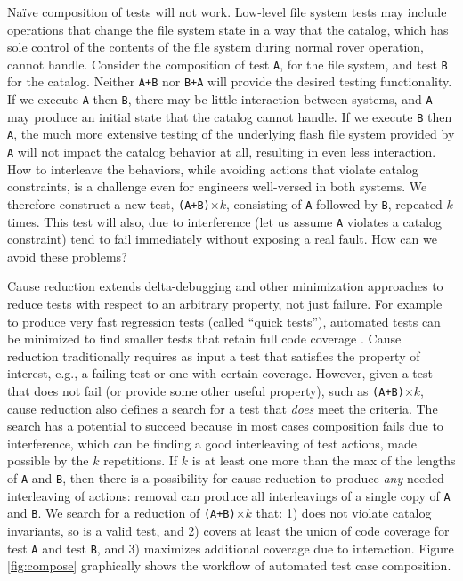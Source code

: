 \documentclass[12pt]{article}
\newcommand{\mycomment}[1]{}
\begin{document}
Na\"ive composition of tests will not work.  Low-level file system tests may
include operations that change the file system state in a way that the
catalog, which has sole control of the contents of the file system during normal rover operation, cannot handle.
Consider the composition of test {\tt A}, for the file system, and
test {\tt B} for the catalog.  Neither {\tt A+B} nor {\tt B+A} will provide the desired
testing functionality.  If we execute {\tt A} then {\tt B}, there may be little
interaction between systems, and {\tt A} may produce an initial state
that the catalog cannot handle.  If we execute {\tt B} then {\tt A},
the much more extensive testing of the underlying flash file system
provided by {\tt A} will not impact the catalog behavior at all, resulting
in even less interaction.  How to interleave the behaviors, while
avoiding actions that violate catalog constraints, is a challenge
even for engineers well-versed in both systems.  We therefore
construct a new test, {\tt (A+B)}$\times k$, consisting of {\tt A}
followed by {\tt B}, repeated $k$ times.  This test will also, due to
interference (let us assume {\tt A} violates a catalog constraint) tend to
fail immediately without exposing a real fault. How can we avoid these problems?

Cause reduction \cite{stvrcausereduce} extends
delta-debugging \cite{DD} and other minimization approaches to reduce tests with
respect to an arbitrary property, not just failure.  For example to produce very fast
regression tests (called ``quick tests''), automated tests can be
minimized to find smaller tests that retain full code coverage \cite{stvrcausereduce}.  \mycomment{In
past work, this approach produced highly efficient tests for
real-world systems such as Mozilla's SpiderMonkey JavaScript engine
and the YAFFS2 flash file system used in Android.}  
Cause reduction traditionally requires as
input a test that satisfies the property of interest, e.g., a failing
test or one with certain coverage.  However, given a test that does not fail (or provide some other useful property), such as {\tt (A+B)}$\times k$, cause reduction also defines a search for a test that \emph{does} meet the criteria.  The search has a potential
to succeed because in most cases composition fails due to
interference, which can be finding a good interleaving of test actions, made possible
by the $k$ repetitions.  If $k$ is at least one more than the max of the lengths of {\tt A} and {\tt B}, then there is a possibility for cause reduction to produce \emph{any} needed interleaving of actions: removal can produce all interleavings of a single copy of {\tt A} and {\tt B}.  We search for a reduction of {\tt (A+B)}$\times k$ that: 1) does not violate catalog invariants, so is a valid test,  and 2) covers at least the union of code coverage for test {\tt A} and test {\tt B}, and 3) maximizes additional coverage due to interaction.  Figure \ref{fig:compose} graphically shows the workflow of automated test case composition.
\end{document}
